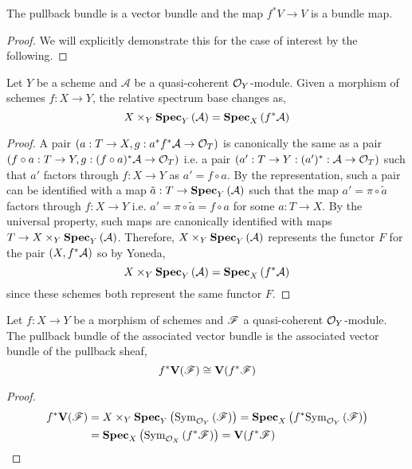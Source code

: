 \documentclass[12pt]{article}
\begin{document}
\begin{lemma}
The pullback bundle is a vector bundle and the map $f^* V \to V$ is a bundle map.
\end{lemma}

\begin{proof}
We will explicitly demonstrate this for the case of interest by the following.
\end{proof}

\begin{lemma}
Let $Y$ be a scheme and $\mathcal{A}$ be a quasi-coherent $\mathcal{O}_{Y}$-module. Given a morphism of schemes $f : X \to Y$, the relative spectrum base changes as,
\[ X \times_Y \mathbf{Spec}_{Y}\left( \mathcal{A} \right) = \mathbf{Spec}_{X}\left( f^* \mathcal{A} \right) \]
\end{lemma}

\begin{proof}
A pair $(a : T \to X, g : a^* f^* \mathcal{A} \to \mathcal{O}_{T})$ is canonically the same as a pair $(f \circ a : T \to Y, g : (f \circ a)^* \mathcal{A} \to \mathcal{O}_{T})$ i.e. a pair $(a' : T \to Y : (a')^* : \mathcal{A} \to \mathcal{O}_{T})$ such that $a'$ factors through $f : X \to Y$ as $a' = f \circ a$. By the representation, such a pair can be identified with a map $\tilde{a} : T \to \mathbf{Spec}_{Y}\left( \mathcal{A} \right)$ such that the map $a' = \pi \circ \tilde{a}$ factors through $f : X \to Y$ i.e. $a' = \pi \circ \tilde{a} = f \circ a$ for some $a : T \to X$. By the universal property, such maps are canonically identified with maps $T \to X \times_Y \mathbf{Spec}_{Y}\left( \mathcal{A} \right)$. Therefore, $X \times_Y \mathbf{Spec}_{Y}\left( \mathcal{A} \right)$ represents the functor $F$ for the pair $(X, f^* \mathcal{A})$ so by Yoneda,
\[ X \times_Y \mathbf{Spec}_{Y}\left( \mathcal{A} \right) = \mathbf{Spec}_{X}\left( f^* \mathcal{A} \right) \]
since these schemes both represent the same functor $F$.
\end{proof}

\begin{lemma}
Let $f : X \to Y$ be a morphism of schemes and $\mathscr{F}$ a quasi-coherent $\mathcal{O}_{Y}$-module. The pullback bundle of the associated vector bundle is the associated vector bundle of the pullback sheaf,
\[ f^* \mathbf{V}(\mathscr{F}) \cong \mathbf{V}(f^* \mathscr{F}) \]
\end{lemma}

\begin{proof}
\begin{align*}
f^* \mathbf{V}(\mathscr{F}) & = X \times_Y \mathbf{Spec}_{Y}\left( \mathrm{Sym}_{\mathcal{O}_{Y}}\left( \mathscr{F} \right) \right) = \mathbf{Spec}_{X}\left( f^* \mathrm{Sym}_{\mathcal{O}_{Y}}\left( \mathscr{F} \right) \right) 
\\
& = \mathbf{Spec}_{X}\left( \mathrm{Sym}_{\mathcal{O}_{X}}\left( f^* \mathscr{F} \right) \right) = \mathbf{V}(f^* \mathscr{F})
\end{align*}
\end{proof}
\end{document}
